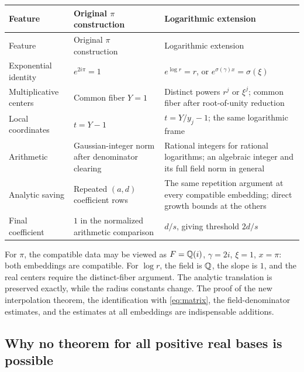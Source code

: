 {\small
\begin{longtable}{@{}>{\raggedright\arraybackslash}p{}
>{\raggedright\arraybackslash}p{}
>{\raggedright\arraybackslash}p{}@{}}
\toprule
Feature & Original \(\pi\) construction & Logarithmic extension\\
\midrule
\endfirsthead
\toprule
Feature & Original \(\pi\) construction & Logarithmic extension\\
\midrule
\endhead
\bottomrule
\endfoot
Exponential identity
& \(e^{2i\pi}=1\)
& \(e^{\log r}=r\), or \(e^{\sigma(\gamma)x}=\sigma(\xi)\)\\[5pt]
Multiplicative centers
& Common fiber \(Y=1\)
& Distinct powers \(r^j\) or \(\xi^j\); common fiber after
root-of-unity reduction\\[5pt]
Local coordinates
& \(t=Y-1\)
& \(t=Y/y_j-1\); the same logarithmic frame\\[5pt]
Arithmetic
& Gaussian-integer norm after denominator clearing
& Rational integers for rational logarithms; an algebraic integer
and its full field norm in general\\[5pt]
Analytic saving
& Repeated \((a,d)\) coefficient rows
& The same repetition argument at every compatible embedding;
direct growth bounds at the others\\[5pt]
Final coefficient
& \(1\) in the normalized arithmetic comparison
& \(d/s\), giving threshold \(2d/s\)\\
\end{longtable}
}

For \(\pi\), the compatible data may be viewed as
\(F=\mathbb Q(i)\), \(\gamma=2i\), \(\xi=1\), \(x=\pi\):
both embeddings are compatible. For \(\log r\), the field is
\(\mathbb Q\), the slope is \(1\), and the real centers require the
distinct-fiber argument. The analytic translation is preserved
exactly, while the radius constants change.
The proof of the new interpolation theorem, the identification with
\eqref{eq:matrix}, the field-denominator estimates, and the estimates
at all embeddings are indispensable additions.

\subsection{Why no theorem for all positive real bases is possible}

